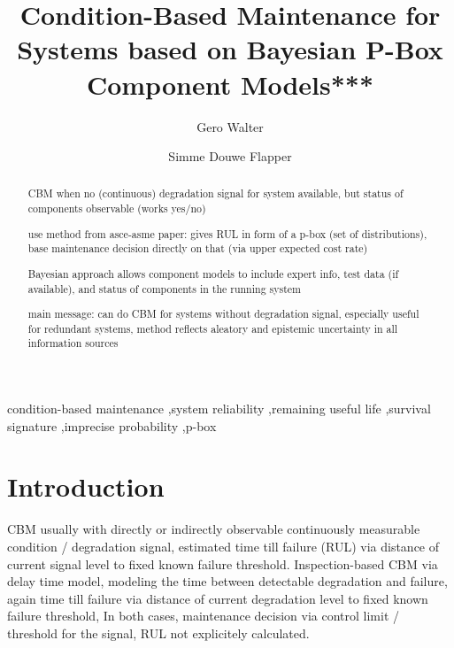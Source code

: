 \documentclass[authoryear]{elsarticle}
\begin{document}

\begin{frontmatter}
\title{Condition-Based Maintenance for Systems based on Bayesian P-Box Component Models***}

\author[tue]{Gero Walter}
\author[tue]{Simme Douwe Flapper}

\address[tue]{School of Industrial Engineering, Eindhoven University of Technology, Eindhoven, Netherlands}


\begin{abstract}
CBM when no (continuous) degradation signal for system available, but status of components observable (works yes/no)

use method from asce-asme paper:
gives RUL in form of a p-box (set of distributions), base maintenance decision directly on that
(via upper expected cost rate)

Bayesian approach allows
component models to include expert info, test data (if available), and status of components in the running system

main message: can do CBM for systems without degradation signal,
especially useful for redundant systems,
method reflects aleatory and epistemic uncertainty in all information sources
\end{abstract}

\begin{keyword}
condition-based maintenance \sep system reliability \sep remaining useful life \sep survival signature \sep imprecise probability \sep p-box
\end{keyword}
\end{frontmatter}



\section{Introduction}
\label{intro}

CBM usually with directly or indirectly observable continuously measurable condition / degradation signal,
estimated time till failure (RUL) \citep{2014:rul-review, 2011:rul-review-statistical}
via distance of current signal level to fixed known failure threshold.
Inspection-based CBM via delay time model, modeling the time between detectable degradation and failure,
again time till failure via distance of current degradation level to fixed known failure threshold,
In both cases, maintenance decision via control limit / threshold for the signal, RUL not explicitely calculated.
\end{document}
